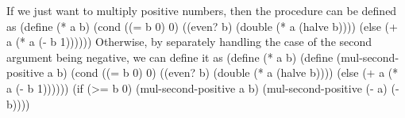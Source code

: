 If we just want to multiply positive numbers, then the procedure can be defined as
\begtt\scm
(define (* a b)
  (cond ((= b 0) 0)
        ((even? b) (double (* a (halve b))))
        (else (+ a (* a (- b 1))))))
\endtt
Otherwise, by separately handling the case of the second argument being negative, we can define it as 
\begtt\scm
(define (* a b)
  (define (mul-second-positive a b)
    (cond ((= b 0) 0)
          ((even? b) (double (* a (halve b))))
          (else (+ a (* a (- b 1))))))
  (if (>= b 0)
      (mul-second-positive a b)
      (mul-second-positive (- a) (- b))))
\endtt
